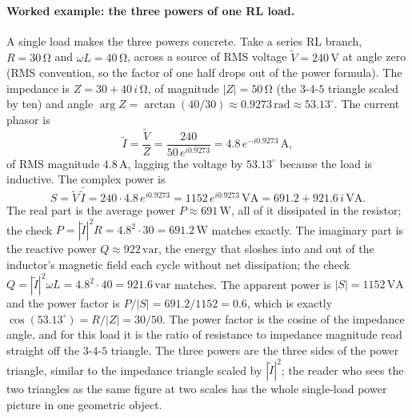 \paragraph{Worked example: the three powers of one RL load.} A single
load makes the three powers concrete. Take a series RL branch, $R =
30\,\si{\ohm}$ and $\omega L = 40\,\si{\ohm}$, across a source of RMS
voltage $\tilde V = 240\,\si{\volt}$ at angle zero (RMS convention, so
the factor of one half drops out of the power formula). The impedance
is $Z = 30 + 40\,i\,\si{\ohm}$, of magnitude $|Z| = 50\,\si{\ohm}$ (the
$3$-$4$-$5$ triangle scaled by ten) and angle $\arg Z = \arctan(40/30)
\approx 0.9273\,\text{rad} \approx 53.13^{\circ}$. The current phasor is
\[
\tilde I = \frac{\tilde V}{Z} = \frac{240}{50\,e^{i 0.9273}}
= 4.8\,e^{-i 0.9273}\,\si{\ampere},
\]
of RMS magnitude $4.8\,\si{\ampere}$, lagging the voltage by
$53.13^{\circ}$ because the load is inductive. The complex power is
\[
S = \tilde V\,\bar{\tilde I}
= 240 \cdot 4.8\,e^{i 0.9273}
= 1152\,e^{i 0.9273}\,\text{VA}
= 691.2 + 921.6\,i\,\text{VA}.
\]
The real part is the average power $P \approx 691\,\si{\watt}$, all of
it dissipated in the resistor; the check $P = |\tilde I|^{2} R = 4.8^{2}
\cdot 30 = 691.2\,\si{\watt}$ matches exactly. The imaginary part is the
reactive power $Q \approx 922\,\text{var}$, the energy that sloshes into
and out of the inductor's magnetic field each cycle without net
dissipation; the check $Q = |\tilde I|^{2} \omega L = 4.8^{2} \cdot 40 =
921.6\,\text{var}$ matches. The apparent power is $|S| = 1152\,\text{VA}$
and the power factor is $P/|S| = 691.2/1152 = 0.6$, which is exactly
$\cos(53.13^{\circ}) = R/|Z| = 30/50$. The power factor is the cosine of
the impedance angle, and for this load it is the ratio of resistance to
impedance magnitude read straight off the $3$-$4$-$5$ triangle. The
three powers are the three sides of the power triangle, similar to the
impedance triangle scaled by $|\tilde I|^{2}$; the reader who sees the
two triangles as the same figure at two scales has the whole
single-load power picture in one geometric object.


